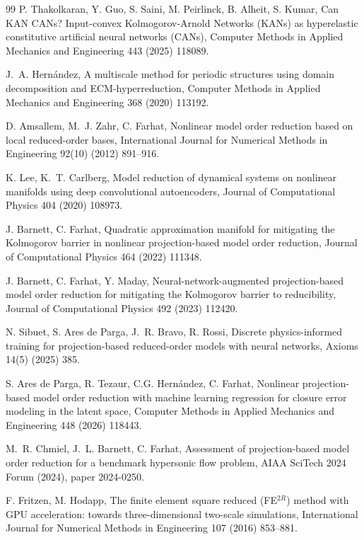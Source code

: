 \begin{thebibliography}{99}
P. Thakolkaran, Y. Guo, S. Saini, M. Peirlinck, B. Alheit, S. Kumar, Can KAN CANs? Input-convex Kolmogorov-Arnold Networks (KANs) as hyperelastic constitutive artificial neural networks (CANs), Computer Methods in Applied Mechanics and Engineering 443 (2025) 118089. 

J.~A. Hern\'andez, A multiscale method for periodic structures using
domain decomposition and ECM-hyperreduction, Computer Methods in
Applied Mechanics and Engineering 368 (2020) 113192.

D. Amsallem, M.~J. Zahr, C. Farhat, Nonlinear model order
reduction based on local reduced-order bases, International
Journal for Numerical Methods in Engineering 92(10) (2012) 891--916.

K. Lee, K.~T. Carlberg, Model reduction of dynamical systems on
nonlinear manifolds using deep convolutional autoencoders,
Journal of Computational Physics 404 (2020) 108973.

J. Barnett, C. Farhat, Quadratic approximation manifold for
mitigating the Kolmogorov barrier in nonlinear projection-based model
order reduction, Journal of Computational Physics 464 (2022) 111348.

J. Barnett, C. Farhat, Y. Maday, Neural-network-augmented projection-based model order reduction for mitigating the Kolmogorov barrier to reducibility, Journal of Computational Physics 492 (2023) 112420.

N. Sibuet, S. Ares de Parga, J.~R. Bravo, R. Rossi,
Discrete physics-informed training for projection-based reduced-order models with neural networks,
Axioms 14(5) (2025) 385.

S. Ares de Parga, R. Tezaur, C.G. Hern\'andez, C. Farhat,
Nonlinear projection-based model order reduction with machine learning regression for closure error modeling in the latent space,
Computer Methods in Applied Mechanics and Engineering 448 (2026) 118443.

M.~R. Chmiel, J.~L. Barnett, C. Farhat, Assessment of
projection-based model order reduction for a benchmark hypersonic flow
problem, AIAA SciTech 2024 Forum (2024), paper 2024-0250.

F. Fritzen, M. Hodapp, The finite element square reduced (FE$^{2R}$) method with GPU acceleration: towards three-dimensional two-scale simulations,
International Journal for Numerical Methods in Engineering 107 (2016) 853--881.


\end{thebibliography}
